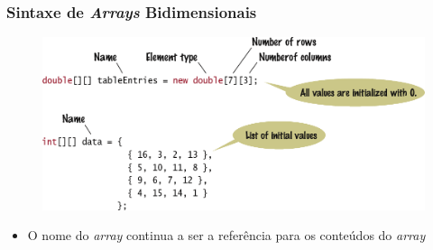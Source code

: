 \documentclass[xcolor={dvipsnames,table},aspectratio=169]{beamer}
\begin{document}
\begin{frame}\frametitle{Sintaxe de \emph{Arrays} Bidimensionais}
\begin{figure}[h]
	\includegraphics[height=0.5\paperheight,center]{pucrs-ep-fprog-unidade_06-arrays-laminas-array_2d_sintaxe.png}
\end{figure}
\begin{itemize}
	\item O nome do \emph{array} continua a ser a referência para os conteúdos do \emph{array}
\end{itemize}
\end{frame}
\end{document}
